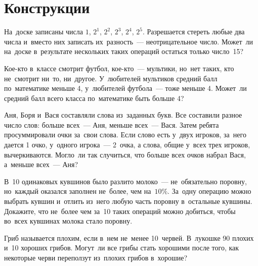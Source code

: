 
\section*{Конструкции}




\begin{problems}

\item
На~доске записаны числа $1$, $2^1$, $2^2$, $2^3$, $2^4$, $2^5$.
Разрешается стереть любые два числа и~вместо них записать их~разность~---
неотрицательное число.
Может~ли на~доске в~результате нескольких таких операций остаться только
число~15?

\item
Кое-кто в~классе смотрит футбол, кое-кто~--- мультики, но~нет таких, кто
не~смотрит ни~то, ни~другое.
У~любителей мультиков средний балл по~математике меньше 4, у~любителей
футбола~--- тоже меньше 4.
Может~ли средний балл всего класса по~математике быть больше 4?

\item
Аня, Боря и~Вася составляли слова из~заданных букв.
Все составили разное число слов: больше всех~--- Аня, меньше всех~--- Вася.
Затем ребята просуммировали очки за~свои слова.
Если слово есть у~двух игроков, за~него дается 1 очко,
у~одного игрока~--- 2~очка,
а слова, общие у~всех трех игроков, вычеркиваются.
Могло~ли так случиться, что больше всех очков набрал Вася, а~меньше всех~---
Аня?

\item
В~10 одинаковых кувшинов было разлито молоко~--- не~обязательно поровну,
но~каждый оказался заполнен не~более, чем на~$10\%$.
За~одну операцию можно выбрать кувшин и~отлить из~него любую часть поровну
в~остальные кувшины.
Докажите, что не~более чем за~10 таких операций можно добиться, чтобы во~всех
кувшинах молока стало поровну.

\item
Гриб называется плохим, если в~нем не~менее 10~червей.
В~лукошке 90 плохих и~10 хороших грибов.
Могут~ли все грибы стать хорошими после того, как некоторые черви переползут
из~плохих грибов в~хорошие?


\end{problems}
